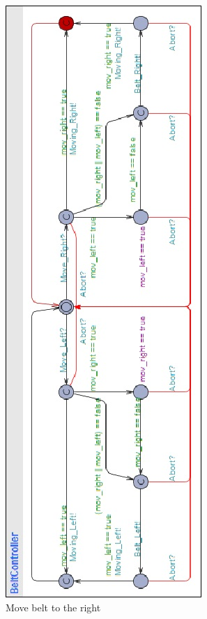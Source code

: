 \documentclass[a4paper,oneside,11pt]{report}
\begin{document}
\begin{figure}
\centering
\includegraphics[height=0.75\textheight]{images/BCTR4.jpg}
\caption{Move belt to the right}
\label{fig:bctr4}
\end{figure}
\end{document}
